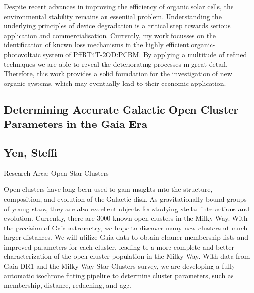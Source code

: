 \noindent Despite recent advances in improving the efficiency of organic solar cells, the environmental stability remains an essential problem. Understanding the underlying principles of device degradation is a critical step towards serious application and commercialisation. Currently, my work focusses on the identification of known loss mechanisms in the highly efficient organic-photovoltaic system of PffBT4T-2OD:PCBM. By applying a multitude of refined techniques we are able to reveal the deteriorating processes in great detail. Therefore, this work provides a solid foundation for the investigation of new organic systems, which may eventually lead to their economic application.
\newpage
\subsection*{\centering \large Determining Accurate Galactic Open Cluster Parameters in the Gaia Era}
\subsection*{\centering \normalsize Yen, Steffi}
Research Area: Open Star Clusters\newline

\noindent Open clusters have long been used to gain insights into the structure, composition, and evolution of the Galactic disk. As gravitationally bound groups of young stars, they are also excellent objects for studying stellar interactions and evolution. Currently, there are 3000 known open clusters in the Milky Way. With the precision of Gaia astrometry, we hope to discover many new clusters at much larger distances. We will utilize Gaia data to obtain cleaner membership lists and improved parameters for each cluster, leading to a more complete and better characterization of the open cluster population in the Milky Way. With data from Gaia DR1 and the Milky Way Star Clusters survey, we are developing a fully automatic isochrone fitting pipeline to determine cluster parameters, such as membership, distance, reddening, and age.

